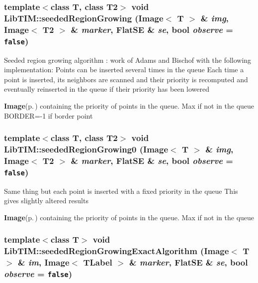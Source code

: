 \subsubsection{\setlength{\rightskip}{0pt plus 5cm}template$<$class T, class T2$>$ void Lib\-TIM::seeded\-Region\-Growing (Image$<$ T $>$ \& {\em img}, Image$<$ T2 $>$ \& {\em marker}, Flat\-SE \& {\em se}, bool {\em observe} = {\tt false})}\label{group__regionGrowing_ga2}


Seeded region growing algorithm : work of Adams and Bischof with the following implementation: Points can be inserted several times in the queue Each time a point is inserted, its neighbors are scanned and their priority is recomputed and eventually reinserted in the queue if their priority has been lowered

{\bf Image}{\rm (p.\,\pageref{classLibTIM_1_1Image})} containing the priority of points in the queue. Max if not in the queue BORDER=-1 if border point 
\subsubsection{\setlength{\rightskip}{0pt plus 5cm}template$<$class T, class T2$>$ void Lib\-TIM::seeded\-Region\-Growing0 (Image$<$ T $>$ \& {\em img}, Image$<$ T2 $>$ \& {\em marker}, Flat\-SE \& {\em se}, bool {\em observe} = {\tt false})}\label{group__regionGrowing_ga3}


Same thing but each point is inserted with a fixed priority in the queue This gives slightly altered results

{\bf Image}{\rm (p.\,\pageref{classLibTIM_1_1Image})} containing the priority of points in the queue. Max if not in the queue 
\subsubsection{\setlength{\rightskip}{0pt plus 5cm}template$<$class T$>$ void Lib\-TIM::seeded\-Region\-Growing\-Exact\-Algorithm (Image$<$ T $>$ \& {\em im}, Image$<$ {\bf TLabel} $>$ \& {\em marker}, Flat\-SE \& {\em se}, bool {\em observe} = {\tt false})}\label{group__regionGrowing_ga1}


